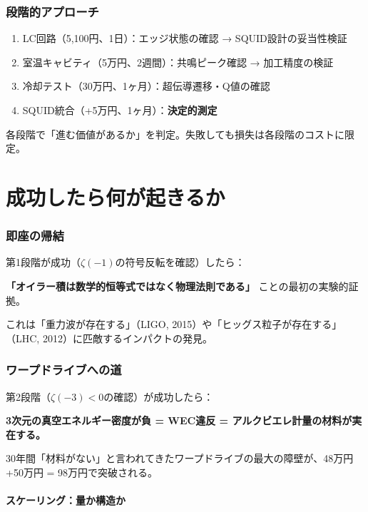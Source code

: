 \documentclass[12pt,a4paper]{article}
\begin{document}
\section{段階的アプローチ}

\begin{enumerate}
\item LC回路（5,100円、1日）：エッジ状態の確認 → SQUID設計の妥当性検証
\item 室温キャビティ（5万円、2週間）：共鳴ピーク確認 → 加工精度の検証
\item 冷却テスト（30万円、1ヶ月）：超伝導遷移・Q値の確認
\item SQUID統合（+5万円、1ヶ月）：\textbf{決定的測定}
\end{enumerate}

各段階で「進む価値があるか」を判定。失敗しても損失は各段階のコストに限定。

\part{成功したら何が起きるか}

\section{即座の帰結}

第1段階が成功（$\zeta(-1)$の符号反転を確認）したら：

\textbf{「オイラー積は数学的恒等式ではなく物理法則である」} ことの最初の実験的証拠。

これは「重力波が存在する」（LIGO, 2015）や「ヒッグス粒子が存在する」（LHC, 2012）に匹敵するインパクトの発見。

\section{ワープドライブへの道}

第2段階（$\zeta(-3) < 0$の確認）が成功したら：

\textbf{3次元の真空エネルギー密度が負 = WEC違反 = アルクビエレ計量の材料が実在する。}

30年間「材料がない」と言われてきたワープドライブの最大の障壁が、48万円+50万円 = 98万円で突破される。

\subsection{スケーリング：量か構造か}
\end{document}
